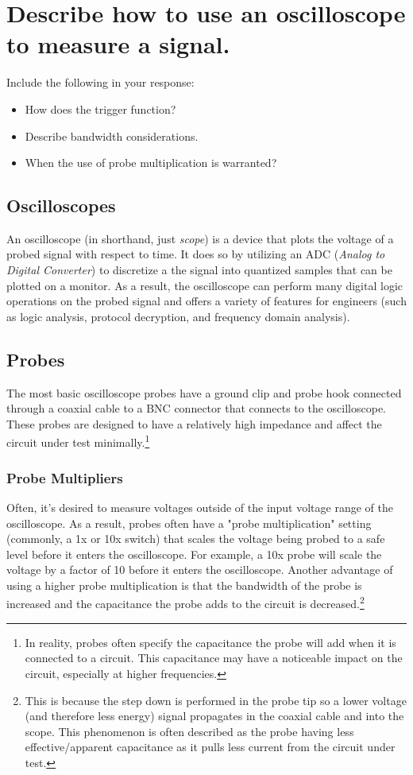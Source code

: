 \documentclass[main.tex]{subfiles}
\begin{document}
\section{Describe how to use an oscilloscope to measure a signal.}

Include the following in your response:
\begin {itemize}
    \item How does the trigger function?
    \item Describe bandwidth considerations.
    \item When the use of probe multiplication is warranted?
\end {itemize}

\spoilerline

\subsection{Oscilloscopes}
An oscilloscope (in shorthand, just \textit{scope}) is a device that plots the voltage of a probed signal with respect to time. It does so by utilizing an ADC (\textit{Analog to Digital Converter}) to discretize a the signal into quantized samples that can be plotted on a monitor. As a result, the oscilloscope can perform many digital logic operations on the probed signal and offers a variety of features for engineers (such as logic analysis, protocol decryption, and frequency domain analysis).

\subsection{Probes}
The most basic oscilloscope probes have a ground clip and probe hook connected through a coaxial cable to a BNC connector that connects to the oscilloscope. These probes are designed to have a relatively high impedance and affect the circuit under test minimally.\footnote{In reality, probes often specify the capacitance the probe will add when it is connected to a circuit. This capacitance may have a noticeable impact on the circuit, especially at higher frequencies.} \newline

\subsubsection{Probe Multipliers}
\newnoindentpara Often, it's desired to measure voltages outside of the input voltage range of the oscilloscope. As a result, probes often have a "probe multiplication" setting (commonly, a 1x or 10x switch) that scales the voltage being probed to a safe level before it enters the oscilloscope. For example, a 10x probe will scale the voltage by a factor of 10 before it enters the oscilloscope. Another advantage of using a higher probe multiplication is that the bandwidth of the probe is increased and the capacitance the probe adds to the circuit is decreased.\footnote{This is because the step down is performed in the probe tip so a lower voltage (and therefore less energy) signal propagates in the coaxial cable and into the scope. This phenomenon is often described as the probe having less effective/apparent capacitance as it pulls less current from the circuit under test.}
\end{document}
